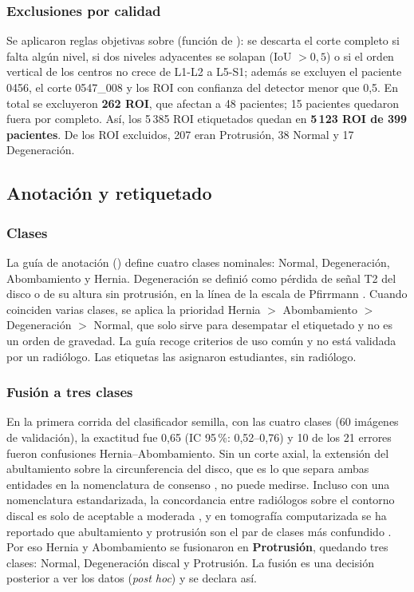 \subsubsection{Exclusiones por calidad}
Se aplicaron reglas objetivas sobre  (función  de ): se descarta el corte completo si falta algún nivel, si dos niveles adyacentes se solapan (IoU $>0{,}5$) o si el orden vertical de los centros no crece de L1-L2 a L5-S1; además se excluyen el paciente 0456, el corte 0547\_008 y los ROI con confianza del detector menor que 0,5. En total se excluyeron \textbf{262 ROI}, que afectan a 48 pacientes; 15 pacientes quedaron fuera por completo. Así, los 5\,385 ROI etiquetados quedan en \textbf{5\,123 ROI de 399 pacientes}. De los ROI excluidos, 207 eran Protrusión, 38 Normal y 17 Degeneración.

\subsection{Anotación y retiquetado}
\label{sec:anotacion}
\subsubsection{Clases}
La guía de anotación () define cuatro clases nominales: Normal, Degeneración, Abombamiento y Hernia. Degeneración se definió como pérdida de señal T2 del disco o de su altura sin protrusión, en la línea de la escala de Pfirrmann \cite{pfirrmann2001}. Cuando coinciden varias clases, se aplica la prioridad Hernia $>$ Abombamiento $>$ Degeneración $>$ Normal, que solo sirve para desempatar el etiquetado y no es un orden de gravedad. La guía recoge criterios de uso común y no está validada por un radiólogo. Las etiquetas las asignaron estudiantes, sin radiólogo.

\subsubsection{Fusión a tres clases}
En la primera corrida del clasificador semilla, con las cuatro clases (60 imágenes de validación), la exactitud fue 0,65 (IC 95\,\%: 0,52--0,76) y 10 de los 21 errores fueron confusiones Hernia--Abombamiento. Sin un corte axial, la extensión del abultamiento sobre la circunferencia del disco, que es lo que separa ambas entidades en la nomenclatura de consenso \cite{fardon2014}, no puede medirse. Incluso con una nomenclatura estandarizada, la concordancia entre radiólogos sobre el contorno discal es solo de aceptable a moderada \cite{arana2011}, y en tomografía computarizada se ha reportado que abultamiento y protrusión son el par de clases más confundido \cite{gao2025}. Por eso Hernia y Abombamiento se fusionaron en \textbf{Protrusión}, quedando tres clases: Normal, Degeneración discal y Protrusión. La fusión es una decisión posterior a ver los datos (\emph{post hoc}) y se declara así.

